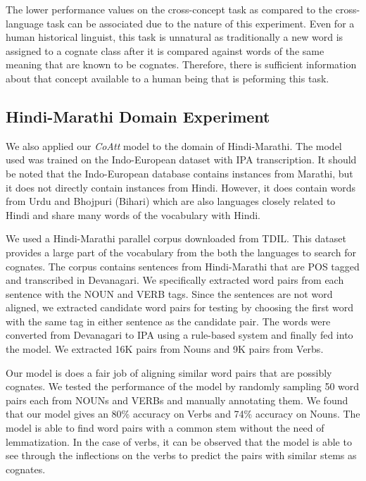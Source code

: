 \documentclass[11pt,letterpaper]{article}
\begin{document}
The lower performance values on the cross-concept task as compared to the cross-language task can be associated due to the nature of this experiment.  Even for a human historical linguist, this task is unnatural as traditionally a new word is assigned to a cognate class after it is compared against words of the same meaning that are known to be cognates. Therefore, there is sufficient information about that concept available to a human being that is peforming this task. 

\subsection{Hindi-Marathi Domain Experiment}

We also applied our \textit{CoAtt} model to the domain of Hindi-Marathi. The model used was trained on the Indo-European dataset with IPA transcription. It should be noted that the Indo-European database contains instances from Marathi, but it does not directly contain instances from Hindi. However, it does contain words from Urdu and Bhojpuri (Bihari) which are also languages closely related to Hindi and share many words of the vocabulary with Hindi.

We used a Hindi-Marathi parallel corpus downloaded from TDIL. This dataset provides a large part of the vocabulary from the both the languages to search for cognates. The corpus contains sentences from Hindi-Marathi that are POS tagged and transcribed in Devanagari. We specifically extracted word pairs from each sentence with the NOUN and VERB tags. Since the sentences are not word aligned, we extracted candidate word pairs for testing by choosing the first word with the same tag in either sentence as the candidate pair. The words were converted from Devanagari to IPA using a rule-based system and finally fed into the model. We extracted 16K pairs from Nouns and 9K pairs from Verbs.

Our model is does a fair job of aligning similar word pairs that are possibly cognates. We tested the performance of the model by randomly sampling 50 word pairs each from NOUNs and VERBs and manually annotating them. We found that our model gives an 80\% accuracy on Verbs and 74\% accuracy on Nouns. The model is able to find word pairs with a common stem without the need of lemmatization. In the case of verbs, it can be observed that the model is able to see through the inflections on the verbs to predict the pairs with similar stems as cognates. 
\end{document}

